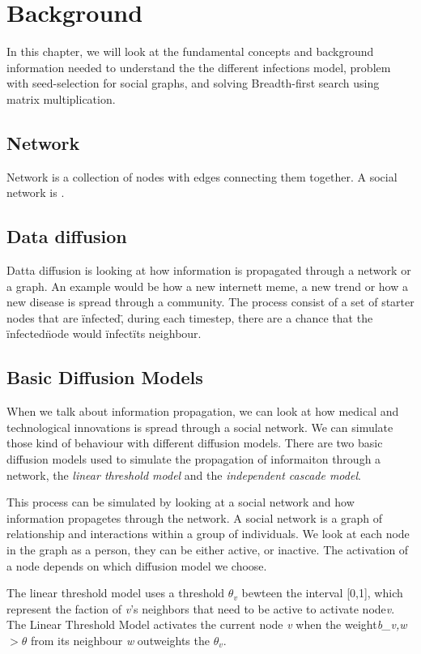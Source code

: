 \chapter{Background} 

In this chapter, we will look at the fundamental concepts and background information needed to understand the the different infections model, problem with seed-selection for social graphs, and solving Breadth-first search using matrix multiplication.

\section{Network}
Network is a collection of nodes with edges connecting them together\cite{TheStrucandcomplex}. A social network is . 

\section{Data diffusion}
Datta diffusion is looking at how information is propagated through a network or a graph. An example would be how a new internett meme, a new trend or how a new disease is spread through a community. The process consist of a set of starter nodes that are \"infected\", during each timestep, there are a chance that the \"infected\" node would \"infect\" its neighbour. 

\section{Basic Diffusion Models}
When we talk about information propagation, we can look at how medical and technological innovations is spread through a social network. We can simulate those kind of behaviour with different diffusion models. There are two basic diffusion models used to simulate the propagation of informaiton through a network\cite{kempe}, the {\it linear threshold model} and the {\it independent cascade model}\cite{kempe}.

This process can be simulated by looking at a social network and how information propagetes through the network. A social network is a graph of relationship and interactions within a group of individuals. 
We look at each node in the graph as a person, they can be either active, or inactive. The activation of a node depends on which diffusion model we choose.

The linear threshold model uses a threshold $\theta_v$ bewteen the interval [0,1], which represent the faction of {\it v}'s neighbors that need to be active to activate node{\it v}. The Linear Threshold Model activates the current node {\it v} when the weight{\it b_{v,w}} $> \theta$ from its neighbour {\it w} outweights the $\theta_v$. 

